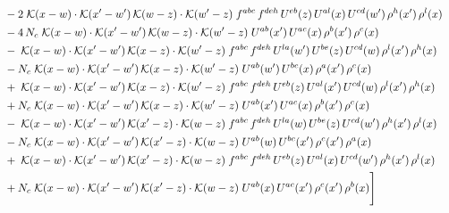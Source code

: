 \documentclass[10pt]{article}
\numberwithin{equation}{section}
\begin{document}
\begin{align}
&\quad -2\;\mathcal{K}(x-w)\cdot\mathcal{K}(x'-w')\,\mathcal{K}(w-z)\cdot\mathcal{K}(w'-z)\;f^{abc}\,f^{deh}\,U^{eb}(z)\,U^{al}(x)\,U^{cd}(w')\,\rho^{h}(x')\,\rho^{l}(x)\notag\\
&\quad -4\,N_c\;\mathcal{K}(x-w)\cdot\mathcal{K}(x'-w')\,\mathcal{K}(w-z)\cdot\mathcal{K}(w'-z)\;U^{ab}(x')\,U^{ac}(x)\,\rho^{b}(x')\,\rho^{c}(x)\notag\\
&\quad -\;\mathcal{K}(x-w)\cdot\mathcal{K}(x'-w')\,\mathcal{K}(x-z)\cdot\mathcal{K}(w'-z)\;f^{abc}\,f^{deh}\,U^{la}(w')\,U^{be}(z)\,U^{cd}(w)\,\rho^{l}(x')\,\rho^{h}(x)\notag\\
&\quad -N_c\;\mathcal{K}(x-w)\cdot\mathcal{K}(x'-w')\,\mathcal{K}(x-z)\cdot\mathcal{K}(w'-z)\;U^{ab}(w')\,U^{bc}(x)\,\rho^{a}(x')\,\rho^{c}(x)\notag\\
&\quad +\;\mathcal{K}(x-w)\cdot\mathcal{K}(x'-w')\,\mathcal{K}(x-z)\cdot\mathcal{K}(w'-z)\;f^{abc}\,f^{deh}\,U^{eb}(z)\,U^{al}(x')\,U^{cd}(w)\,\rho^{l}(x')\,\rho^{h}(x)\notag\\
&\quad +N_c\;\mathcal{K}(x-w)\cdot\mathcal{K}(x'-w')\,\mathcal{K}(x-z)\cdot\mathcal{K}(w'-z)\;U^{ab}(x')\,U^{ac}(x)\,\rho^{b}(x')\,\rho^{c}(x)\notag\\
&\quad -\;\mathcal{K}(x-w)\cdot\mathcal{K}(x'-w')\,\mathcal{K}(x'-z)\cdot\mathcal{K}(w-z)\;f^{abc}\,f^{deh}\,U^{la}(w)\,U^{be}(z)\,U^{cd}(w')\,\rho^{h}(x')\,\rho^{l}(x)\notag\\
&\quad -N_c\;\mathcal{K}(x-w)\cdot\mathcal{K}(x'-w')\,\mathcal{K}(x'-z)\cdot\mathcal{K}(w-z)\;U^{ab}(w)\,U^{bc}(x')\,\rho^{c}(x')\,\rho^{a}(x)\notag\\
&\quad +\;\mathcal{K}(x-w)\cdot\mathcal{K}(x'-w')\,\mathcal{K}(x'-z)\cdot\mathcal{K}(w-z)\;f^{abc}\,f^{deh}\,U^{eb}(z)\,U^{al}(x)\,U^{cd}(w')\,\rho^{h}(x')\,\rho^{l}(x)\notag\\
&\quad +N_c\;\mathcal{K}(x-w)\cdot\mathcal{K}(x'-w')\,\mathcal{K}(x'-z)\cdot\mathcal{K}(w-z)\;U^{ab}(x)\,U^{ac}(x')\,\rho^{c}(x')\,\rho^{b}(x)\Bigg]\label{eq:gen}
\end{align}
\end{document}
